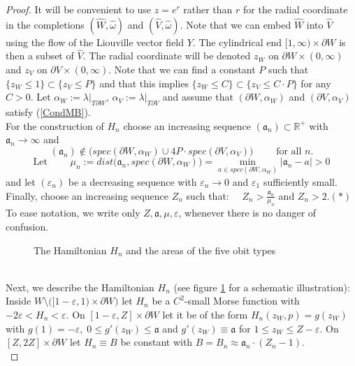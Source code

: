 \documentclass[a4paper,12pt,bibliography=totocnumbered,titlepage=false,abstracton,bookmarksnumbered=true]{scrartcl}
\newcommand{\veps}{\varepsilon}
\theoremstyle{definition}
\begin{document}
\begin{proof}
 It will be convenient to use $z=e^r$ rather than $r$ for the radial coordinate in the completions $(\widehat{W},\widehat{\omega})$ and $(\widehat{V},\widehat{\omega})$. Note that we can embed $\widehat{W}$ into $\widehat{V}$ using the flow of the Liouville vector field $Y$. The cylindrical end $[1,\infty)\times\partial W$ is then a subset of $\widehat{V}$. The radial coordinate will be denoted $z_W$ on $\partial W\times(0,\infty)$ and  $z_V$ on $\partial V\times(0,\infty)$. Note that we can find a constant $P$ such that $\{z_W{\leq} 1\}\subset \{z_V{\leq} P\}$ and that this implies $\{z_W{\leq} C\}\subset\{z_V{\leq} C{\cdot} P\}$ for any $C>0$. Let $\alpha_W:=\lambda|_{T\partial W}$, $\alpha_V:=\lambda|_{T\partial V}$ and assume that $(\partial W,\alpha_W)$ and $(\partial V,\alpha_V)$ satisfy (\ref{CondMB}).\\
 For the construction of $H_n$ choose an increasing sequence $(\mathfrak{a}_n)\subset\mathbb{R}^+$ with $\mathfrak{a}_n\rightarrow\infty$ and 
 \[(\mathfrak{a}_n)\not\in \Big(spec(\partial W,\alpha_W)\cup 4P{\cdot} spec(\partial V,\alpha_V)\Big)\qquad\text{ for all $n$}.\]
 \[\text{Let }\qquad\mu_n:=dist\big(\mathfrak{a}_n,spec(\partial W,\alpha_W)\big)=\min_{a\in spec(\partial W,\alpha_W)}|\mathfrak{a}_n-a|>0\]
 and let $(\veps_n)$ be a decreasing sequence with $\veps_n\rightarrow 0$ and $\veps_1$ sufficiently small.\bigskip\\ 
 Finally, choose an increasing sequence $Z_n$ such that: $\quad Z_n>\frac{\mathfrak{a}_n}{\mu_n}$ and $Z_n>2$.\hfill $(\ast)$\bigskip\\
To ease notation, we write only $Z,\mathfrak{a},\mu,\veps$, whenever there is no danger of confusion.\\
 \begin{figure}[ht]
\centering
 \resizebox{15cm}{!}{}
 \caption{\label{fig7}The Hamiltonian $H_n$ and the areas of the five obit types}
\end{figure}\\
 Next, we describe the Hamiltonian $H_n$ (see figure \ref{fig7} for a schematic illustration):\\
 Inside $W\setminus\big([1-\veps,1){\times}\partial W\big)$ let $H_n$ be a $C^2$-small Morse function with $-2\veps<H_n< \veps$. On $[1-\veps,Z]{\times}\partial W$ let it be of the form $H_n(z_W,p)=g(z_W)$ with $g(1)=-\veps,\;0\leq g'(z_W)\leq \mathfrak{a}$ and $g'(z_W)\equiv \mathfrak{a}$ for $1\leq z_W \leq Z{-}\veps$. On $[Z,2Z]{\times} \partial W$ let $H_n\equiv B$ be constant with $B=B_n\approx \mathfrak{a}_n{\cdot}(Z_n{-}1)$.\\

\end{proof}
\end{document}
